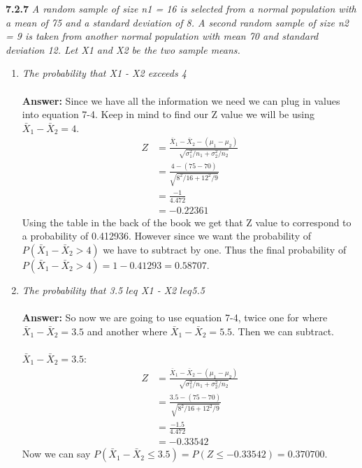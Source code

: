 \documentclass[11pt]{article}
\begin{document}


\noindent \textbf{7.2.7} \emph{ A random sample of size n1 = 16 is selected from a normal population with a mean of 75 and a standard deviation of 8. A second random sample of size n2 = 9 is taken from another normal population with mean 70 and standard
deviation 12. Let X1 and X2 be the two sample means.}
\begin{enumerate}
\item \emph{The probability that X1 - X2 exceeds 4}\\
\\\textbf{Answer:} Since we have all the information we need we can plug in values into equation 7-4. Keep in mind to find our Z value we will be using $\bar{X}_1 - \bar{X}_2 = 4$.
\begin{equation}
\begin{split}
Z &= \frac{\bar{X}_1 - \bar{X}_2 - (\mu_1 - \mu_2)}{\sqrt{\sigma_1^2/n_1 + \sigma_2^2/n_2}}\\
&= \frac{4 - (75 - 70)}{\sqrt{8^2/16 + 12^2/9}}\\
&= \frac{-1}{4.472} \\
&= -0.22361
\end{split}
\end{equation}
Using the table in the back of the book we get that Z value to correspond to a probability of 0.412936. However since we want the probability of $P(\bar{X}_1 - \bar{X}_2 > 4)$ we have to subtract by one. Thus the final probability of $P(\bar{X}_1 - \bar{X}_2 > 4) = 1 - 0.41293 = 0.58707$.
\item \emph{The probability that 3.5 $leq$ X1 - X2 $leq$5.5}\\
\\\textbf{Answer:} So now we are going to use equation 7-4, twice one for where $\bar{X}_1 - \bar{X}_2 = 3.5$ and another where $\bar{X}_1 - \bar{X}_2 = 5.5$. Then we can subtract. \\\\
$\bar{X}_1 - \bar{X}_2 = 3.5$:
\begin{equation}
\begin{split}
Z &= \frac{\bar{X}_1 - \bar{X}_2 - (\mu_1 - \mu_2)}{\sqrt{\sigma_1^2/n_1 + \sigma_2^2/n_2}}\\
&= \frac{3.5 - (75 - 70)}{\sqrt{8^2/16 + 12^2/9}}\\
&= \frac{-1.5}{4.472} \\
&= -0.33542
\end{split}
\end{equation}
Now we can say $P(\bar{X}_1 - \bar{X}_2 \leq 3.5) = P(Z\leq-0.33542) = 0.370700$.\\

\end{enumerate}
\end{document}
